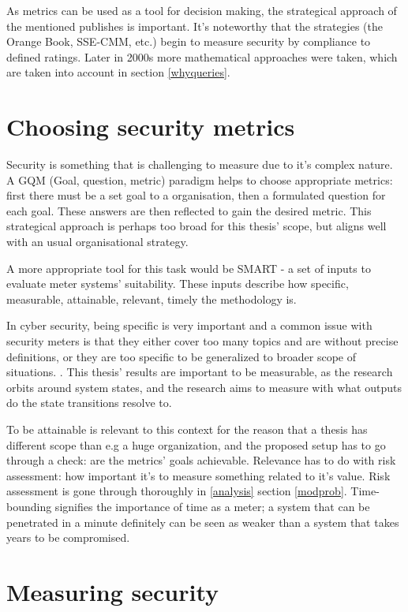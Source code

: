 As metrics can be used as a tool for decision making, the strategical approach of the mentioned publishes is important. It's noteworthy that the strategies (the Orange Book, SSE-CMM, etc.) begin to measure security by compliance to defined ratings. Later in 2000s more mathematical approaches were taken, which are taken into account in section \ref{whyqueries}. \cite{bayuk2013measuring} 

\section{Choosing security metrics} \label{choosingsecmet}

Security is something that is challenging to measure due to it's complex nature. A GQM (Goal, question, metric) paradigm helps to choose appropriate metrics: first there must be a set goal to a organisation, then a formulated question for each goal. These answers are then reflected to gain the desired metric. This strategical approach is perhaps too broad for this thesis' scope, but aligns well with an usual organisational strategy. \cite{papazov2019cybersecurity}

A more appropriate tool for this task would be SMART - a set of inputs to evaluate meter systems' suitability. These inputs describe how specific, measurable, attainable, relevant, timely the methodology is.\cite{payne2006guide}

In cyber security, being specific is very important and a common issue with security meters is that they either cover too many topics and are without precise definitions, or they are too specific to be generalized to broader scope of situations. \cite{wang2005information}. This thesis' results are important to be measurable, as the research orbits around system states, and the research aims to measure with what outputs do the state transitions resolve to.

To be attainable is relevant to this context for the reason that a thesis has different scope than e.g a huge organization, and the proposed setup has to go through a check: are the metrics' goals achievable. Relevance has to do with risk assessment: how important it's to measure something related to it's value. Risk assessment is gone through thoroughly in \ref{analysis} section \ref{modprob}. Time-bounding signifies the importance of time as a meter; a system that can be penetrated in a minute definitely can be seen as weaker than a system that takes years to be compromised.

\section{Measuring security}

